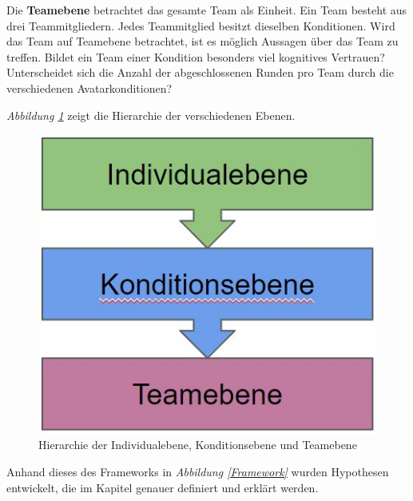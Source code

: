 \documentclass[a4paper,11pt]{article}%
\renewcommand{\\}{\vspace*{0.5\baselineskip} \newline}
\begin{document}
Die \textbf{Teamebene} betrachtet das gesamte Team als Einheit. Ein Team besteht aus drei Teammitgliedern. Jedes Teammitglied besitzt dieselben Konditionen. Wird das Team auf Teamebene betrachtet, ist es möglich Aussagen über das Team zu treffen. Bildet ein Team einer Kondition besonders viel kognitives Vertrauen? Unterscheidet sich die Anzahl der abgeschlossenen Runden pro Team durch die verschiedenen Avatarkonditionen?

\textit{Abbildung \ref{DifferentLevels}} zeigt die Hierarchie der verschiedenen Ebenen.


\begin{figure}[H]
		\begin{footnotesize}
		\centering
			\includegraphics[scale=0.4]{Abbildungen/DifferentLevels.JPG}
			
			\caption[Abbildung 1]{Hierarchie der Individualebene, Konditionsebene und Teamebene}
			\label{DifferentLevels}
		\end{footnotesize}
	\end{figure}

Anhand dieses des Frameworks in \textit{Abbildung \ref{Framework}} wurden Hypothesen entwickelt, die im Kapitel \textit{} genauer definiert und erklärt werden.
\end{document}
